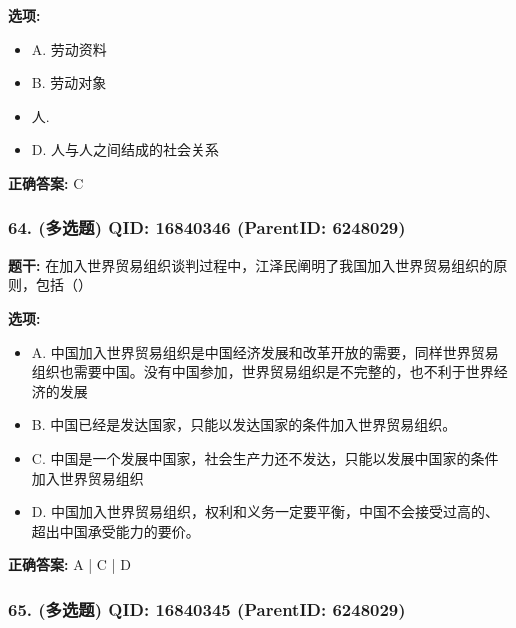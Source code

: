 \documentclass[12pt,UTF8]{ctexart}
\begin{document}
\textbf{选项:}
\begin{itemize}[leftmargin=*]

  \item A. 劳动资料

  \item B. 劳动对象

  \item 人. 

  \item D. 人与人之间结成的社会关系

\end{itemize}

\textbf{正确答案:}
C

\vspace{0.3em}\hrulefill\vspace{0.7em}

\subsubsection*{64. (多选题) \small QID: 16840346 (ParentID: 6248029)}

\textbf{题干:}
在加入世界贸易组织谈判过程中，江泽民阐明了我国加入世界贸易组织的原则，包括（）



\textbf{选项:}
\begin{itemize}[leftmargin=*]

  \item A. 中国加入世界贸易组织是中国经济发展和改革开放的需要，同样世界贸易组织也需要中国。没有中国参加，世界贸易组织是不完整的，也不利于世界经济的发展

  \item B. 中国已经是发达国家，只能以发达国家的条件加入世界贸易组织。

  \item C. 中国是一个发展中国家，社会生产力还不发达，只能以发展中国家的条件加入世界贸易组织

  \item D. 中国加入世界贸易组织，权利和义务一定要平衡，中国不会接受过高的、超出中国承受能力的要价。

\end{itemize}

\textbf{正确答案:}
A | C | D

\vspace{0.3em}\hrulefill\vspace{0.7em}

\subsubsection*{65. (多选题) \small QID: 16840345 (ParentID: 6248029)}
\end{document}
